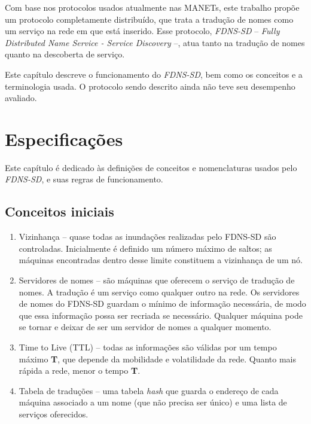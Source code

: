 
Com base nos protocolos usados atualmente nas MANETs, este trabalho propõe um protocolo
completamente distribuído, que trata a tradução de nomes como um serviço na rede
em que está inserido. Esse protocolo, \textit{FDNS-SD} -- 
\textit{Fully Distributed Name Service - Service Discovery} --, atua tanto na
tradução de nomes quanto na descoberta de serviço.

Este capítulo descreve o funcionamento do \textit{FDNS-SD}, bem como os conceitos
e a terminologia usada. O protocolo sendo descrito ainda não teve seu desempenho
avaliado.

\section{Especificações}
	Este capítulo é dedicado às definições de conceitos e nomenclaturas usados pelo
	\textit{FDNS-SD}, e suas regras de funcionamento.
	
    \subsection{Conceitos iniciais}
        \begin{enumerate}
            \item \label{vizinhanca} Vizinhança -- quase todas as inundações realizadas pelo FDNS-SD são
            controladas. Inicialmente é definido um número máximo de saltos; as
            máquinas  encontradas dentro desse limite constituem a vi\-zi\-nhan\-ça
            de um nó.
            \item Servidores de nomes -- são máquinas que oferecem o serviço de
            tradução de nomes. A tradução é um serviço como qualquer outro na rede.
            Os servidores de nomes do FDNS-SD guardam o mínimo de informação
            necessária, de modo que essa informação possa ser recriada se necessário.
            Qualquer máquina pode se tornar e deixar de ser um servidor de nomes
            a qualquer momento.
            \item Time to Live (TTL) -- todas as informações são válidas por um 
            tempo máximo \textbf{T}, que depende da mobilidade e volatilidade da
            rede. Quanto mais rápida a rede, menor o tempo \textbf{T}.
            \item Tabela de traduções -- uma tabela \textit{hash} que guarda o
            endereço de cada máquina associado a um nome (que não precisa ser único)
            e uma lista de serviços oferecidos.
        \end{enumerate}
        
